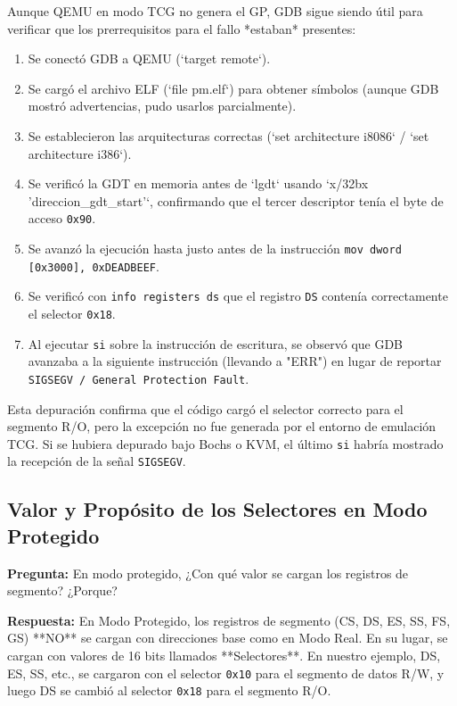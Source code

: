 Aunque QEMU en modo TCG no genera el GP, GDB sigue siendo útil para verificar que los prerrequisitos para el fallo *estaban* presentes:
\begin{enumerate}
    \item Se conectó GDB a QEMU (`target remote`).
    \item Se cargó el archivo ELF (`file pm.elf`) para obtener símbolos (aunque GDB mostró advertencias, pudo usarlos parcialmente).
    \item Se establecieron las arquitecturas correctas (`set architecture i8086` / `set architecture i386`).
    \item Se verificó la GDT en memoria antes de `lgdt` usando `x/32bx 'direccion\_gdt\_start'`, confirmando que el tercer descriptor tenía el byte de acceso \texttt{0x90}.
    \item Se avanzó la ejecución hasta justo antes de la instrucción \texttt{mov dword [0x3000], 0xDEADBEEF}.
    \item Se verificó con \texttt{info registers ds} que el registro \texttt{DS} contenía correctamente el selector \texttt{0x18}.
    \item Al ejecutar \texttt{si} sobre la instrucción de escritura, se observó que GDB avanzaba a la siguiente instrucción (llevando a "ERR") en lugar de reportar \texttt{SIGSEGV / General Protection Fault}.
\end{enumerate}

Esta depuración confirma que el código cargó el selector correcto para el segmento R/O, pero la excepción no fue generada por el entorno de emulación TCG. Si se hubiera depurado bajo Bochs o KVM, el último \texttt{si} habría mostrado la recepción de la señal \texttt{SIGSEGV}.

\subsection{Valor y Propósito de los Selectores en Modo Protegido}

\textbf{Pregunta:} En modo protegido, ¿Con qué valor se cargan los registros de segmento? ¿Porque?

\textbf{Respuesta:}
En Modo Protegido, los registros de segmento (CS, DS, ES, SS, FS, GS) **NO** se cargan con direcciones base como en Modo Real. En su lugar, se cargan con valores de 16 bits llamados **Selectores**. En nuestro ejemplo, DS, ES, SS, etc., se cargaron con el selector \texttt{0x10} para el segmento de datos R/W, y luego DS se cambió al selector \texttt{0x18} para el segmento R/O.

